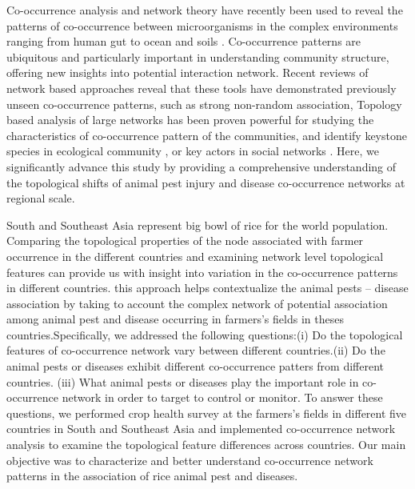 Co-occurrence analysis and network theory have recently been used to reveal the patterns of co-occurrence between microorganisms in the complex environments ranging from human gut to ocean and soils \citep{Faust_2012_Microbial_co,Ma_2016_Geographic}. Co-occurrence patterns are ubiquitous and particularly important in understanding community structure, offering new insights into potential interaction network. Recent reviews of network based approaches reveal that these tools have demonstrated previously unseen co-occurrence patterns, such as strong non-random association, Topology based analysis of large networks has been proven powerful for studying the characteristics of co-occurrence pattern of the communities, and identify keystone species in ecological community \citep{Williams_2014_demonstrating,Barberan_2012_Network}, or key actors in social networks \citep{Crowston_2006_Hierarchy}. Here, we significantly advance this study by providing a comprehensive understanding of the topological shifts of animal pest injury and disease co-occurrence networks at regional scale.

South and Southeast Asia represent big bowl of rice for the world population. Comparing the topological properties of the node associated with farmer occurrence in the different countries and examining network level topological features can provide us with insight into variation in the co-occurrence patterns in different countries. this approach helps contextualize the animal pests -- disease association by taking to account the complex network of potential association among animal pest and disease occurring in farmers's fields in theses countries.Specifically, we addressed the following questions:(i) Do the topological features of co-occurrence network vary between different countries.(ii) Do the animal pests or diseases exhibit different co-occurrence patters from different countries. (iii) What animal pests or diseases play the important role in co-occurrence network in order to target to control or monitor. To answer these questions, we performed crop health survey at the farmers's fields in different five countries in South and Southeast Asia and implemented co-occurrence network analysis to examine the topological feature differences  across countries. Our main objective was to characterize and better understand co-occurrence network patterns in the association of rice animal pest and diseases.